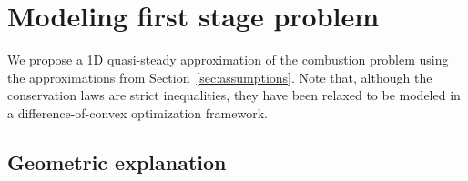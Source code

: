 \section{Modeling first stage problem}

We propose a 1D quasi-steady approximation of the combustion problem
using the approximations from Section~\ref{sec:assumptions}. Note
that, although the conservation laws are strict inequalities,
they have been relaxed to be modeled in a difference-of-convex
optimization framework.

\subsection{Geometric explanation}


